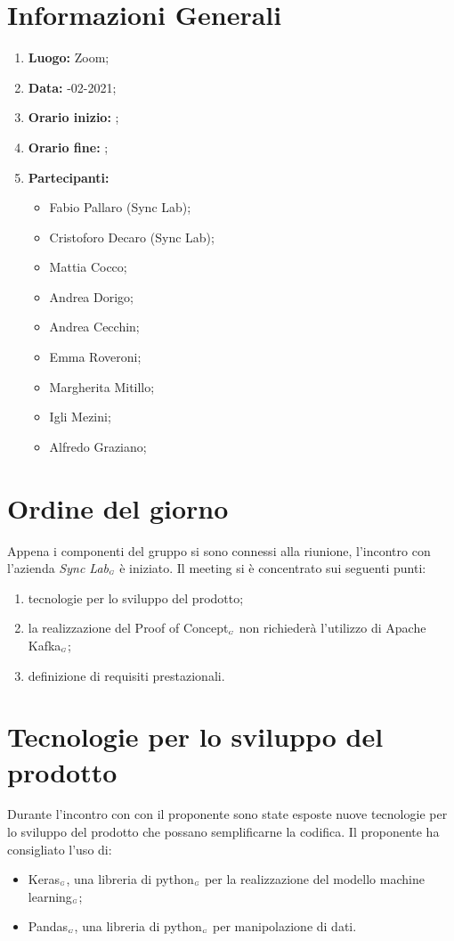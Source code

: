 \newpage
\section{Informazioni Generali}
\begin{enumerate}
	\item \textbf{Luogo:} \normalfont Zoom;
	\item \textbf{Data:} -02-2021;
	\item \textbf{Orario inizio:} ;
	\item \textbf{Orario fine:} ;
	\item \textbf{Partecipanti:}
	\begin{itemize}
		\item Fabio Pallaro (Sync Lab);
		\item Cristoforo Decaro (Sync Lab);
		\item Mattia Cocco;
		\item Andrea Dorigo;
		\item Andrea Cecchin;
		\item Emma Roveroni;
		\item Margherita Mitillo;
		\item Igli Mezini;
		\item Alfredo Graziano;
	\end{itemize}
\end{enumerate}
\section{Ordine del giorno}
Appena i componenti del gruppo si sono connessi alla riunione, l'incontro con l'azienda \textit{Sync Lab}$_{\scaleto{G}{3pt}}$ è iniziato.
Il meeting si è concentrato sui seguenti punti:
\begin{enumerate}
	\item tecnologie per lo sviluppo del prodotto;
	\item la realizzazione del Proof of Concept$_{\scaleto{G}{3pt}}$ non richiederà l'utilizzo di Apache Kafka$_{\scaleto{G}{3pt}}$;
	\item definizione di requisiti prestazionali.
\end{enumerate}
\section{Tecnologie per lo sviluppo del prodotto}
Durante l'incontro con con il proponente sono state esposte nuove tecnologie per lo sviluppo del prodotto che possano semplificarne la codifica. Il proponente ha consigliato l'uso di:
\begin{itemize}
	\item Keras$_{\scaleto{G}{3pt}}$, una libreria di python$_{\scaleto{G}{3pt}}$ per la realizzazione del modello machine learning$_{\scaleto{G}{3pt}}$;
	\item Pandas$_{\scaleto{G}{3pt}}$, una libreria di python$_{\scaleto{G}{3pt}}$ per manipolazione di dati.
\end{itemize}
